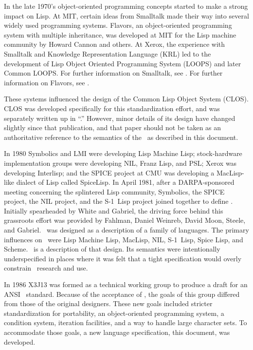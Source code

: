 In the late 1970's object-oriented programming concepts started to make a strong impact on Lisp.  At MIT, certain ideas from Smalltalk made their way into several widely used programming systems. Flavors, an object-oriented programming system with multiple inheritance,  was developed at MIT for the Lisp machine community by Howard Cannon and others. At Xerox, the experience with Smalltalk and  Knowledge Representation Language (KRL) led to the development of  Lisp Object Oriented Programming System (LOOPS) and later Common LOOPS. For further information on Smalltalk, see {\SmalltalkBook}. For further information on Flavors, see {\FlavorsPaper}.

These systems influenced the design of the Common Lisp Object System (CLOS). CLOS was developed specifically for this standardization effort, and was separately written up in ``\CLOSPaper.''  However, minor details of its design have changed slightly since that publication, and that paper  should not be taken as an authoritative reference to the semantics of the \CLOS\ as described in this document.

In 1980 Symbolics and LMI were developing Lisp Machine Lisp; stock-hardware implementation groups were developing NIL, Franz Lisp, and PSL; Xerox was developing Interlisp; and the SPICE project at CMU was developing a MacLisp-like dialect of Lisp called SpiceLisp.
  In April 1981, after a DARPA-sponsored meeting concerning the splintered Lisp community, Symbolics, the SPICE project, the NIL project, and the \hbox{S-1}~Lisp project joined together to define \clisp.  Initially spearheaded by White and Gabriel, the driving force behind this grassroots effort was provided by Fahlman, Daniel Weinreb, David Moon, Steele,  and Gabriel. \clisp\ was designed as a description of a family of languages.  The primary influences on \clisp\ were Lisp Machine Lisp, MacLisp, NIL, \hbox{S-1}~Lisp, Spice Lisp, and Scheme. \CLtL\ is a description of that design.  Its semantics were intentionally underspecified in places where it was felt that a tight specification would overly constrain \clisp\ research and use.

In 1986 X3J13 was formed as a technical working group to produce a draft for an ANSI \clisp\ standard. Because of the acceptance of \clisp, the goals of this group differed from those of the original designers. These new goals included stricter standardization for portability, an object-oriented programming system, a condition system, iteration facilities, and a way to handle large character sets.  To accommodate those goals, a new language specification, this document, was developed.
  \endsubSection%

